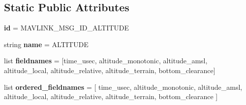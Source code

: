 \subsection*{Static Public Attributes}
\begin{DoxyCompactItemize}
\item 
\mbox{\label{classpymavlink_1_1dialects_1_1v10_1_1MAVLink__altitude__message_adfc532e594087fae8e25c1287e621e91}} 
{\bfseries id} = M\+A\+V\+L\+I\+N\+K\+\_\+\+M\+S\+G\+\_\+\+I\+D\+\_\+\+A\+L\+T\+I\+T\+U\+DE
\item 
\mbox{\label{classpymavlink_1_1dialects_1_1v10_1_1MAVLink__altitude__message_ab85746e4cf7e01c28c518945b410e6fc}} 
string {\bfseries name} = \textquotesingle{}A\+L\+T\+I\+T\+U\+DE\textquotesingle{}
\item 
\mbox{\label{classpymavlink_1_1dialects_1_1v10_1_1MAVLink__altitude__message_a65058f4907f7911b2d8707498efe20b8}} 
list {\bfseries fieldnames} = \mbox{[}\textquotesingle{}time\+\_\+usec\textquotesingle{}, \textquotesingle{}altitude\+\_\+monotonic\textquotesingle{}, \textquotesingle{}altitude\+\_\+amsl\textquotesingle{}, \textquotesingle{}altitude\+\_\+local\textquotesingle{}, \textquotesingle{}altitude\+\_\+relative\textquotesingle{}, \textquotesingle{}altitude\+\_\+terrain\textquotesingle{}, \textquotesingle{}bottom\+\_\+clearance\textquotesingle{}\mbox{]}
\item 
\mbox{\label{classpymavlink_1_1dialects_1_1v10_1_1MAVLink__altitude__message_a6c85f3de468344bc7bd8ce0bfe68f3ed}} 
list {\bfseries ordered\+\_\+fieldnames} = \mbox{[} \textquotesingle{}time\+\_\+usec\textquotesingle{}, \textquotesingle{}altitude\+\_\+monotonic\textquotesingle{}, \textquotesingle{}altitude\+\_\+amsl\textquotesingle{}, \textquotesingle{}altitude\+\_\+local\textquotesingle{}, \textquotesingle{}altitude\+\_\+relative\textquotesingle{}, \textquotesingle{}altitude\+\_\+terrain\textquotesingle{}, \textquotesingle{}bottom\+\_\+clearance\textquotesingle{} \mbox{]}
\item 
\mbox{\label{classpymavlink_1_1dialects_1_1v10_1_1MAVLink__altitude__message_a4357c9dc507a117a5acd4f3ce4c98b57}} 

\end{DoxyCompactItemize}
